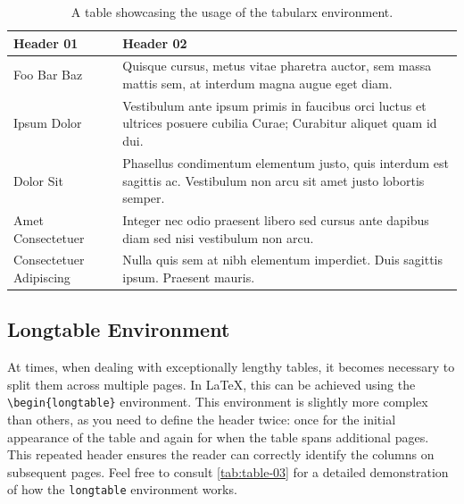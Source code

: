 {\begin{table}[!htpb]
    \caption{A table showcasing the usage of the tabularx environment.}
    \label{tab:table-02}
    \begin{tabularx}{\textwidth}{lX}
        \toprule
        \textbf{Header 01} & \textbf{Header 02} \\ 
        \midrule
        Foo Bar Baz & Quisque cursus, metus vitae pharetra auctor, sem massa mattis sem, at interdum magna augue eget diam. \\
        Ipsum Dolor & Vestibulum ante ipsum primis in faucibus orci luctus et ultrices posuere cubilia Curae; Curabitur aliquet quam id dui. \\
        Dolor Sit & Phasellus condimentum elementum justo, quis interdum est sagittis ac. Vestibulum non arcu sit amet justo lobortis semper. \\
        Amet Consectetuer & Integer nec odio praesent libero sed cursus ante dapibus diam sed nisi vestibulum non arcu. \\
        Consectetuer Adipiscing & Nulla quis sem at nibh elementum imperdiet. Duis sagittis ipsum. Praesent mauris. \\
        \bottomrule
    \end{tabularx}
\end{table}

\subsection{Longtable Environment}
At times, when dealing with exceptionally lengthy tables, it becomes necessary to split them across multiple pages. In \LaTeX, this can be achieved using the \verb|\begin{longtable}| environment. This environment is slightly more complex than others, as you need to define the header twice: once for the initial appearance of the table and again for when the table spans additional pages. This repeated header ensures the reader can correctly identify the columns on subsequent pages. Feel free to consult \autoref{tab:table-03} for a detailed demonstration of how the \verb|longtable| environment works.

}
